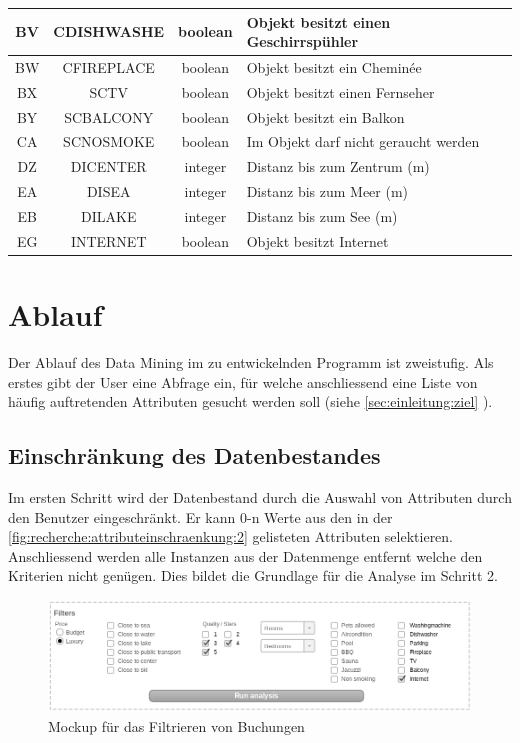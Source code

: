\begin{table}[H]
\begin{tabular}{ | c | c | c | l | }
		BV & CDISHWASHE & boolean & Objekt besitzt einen Geschirrspühler \\ \hline
		BW & CFIREPLACE & boolean & Objekt besitzt ein Cheminée \\ \hline 
		BX & SCTV & boolean & Objekt besitzt einen Fernseher \\ \hline  
		BY & SCBALCONY & boolean & Objekt besitzt ein Balkon \\ \hline 
		CA & SCNOSMOKE & boolean & Im Objekt darf nicht geraucht werden \\ \hline 
		DZ & DICENTER & integer & Distanz bis zum Zentrum (m) \\ \hline 
		EA & DISEA & integer & Distanz bis zum Meer (m) \\ \hline 
		EB & DILAKE & integer & Distanz bis zum See (m) \\ \hline 
		EG & INTERNET & boolean & Objekt besitzt Internet \\ \hline 
	\end{tabular}
\end{table}


\section{Ablauf}
\label{sec:konzept:ablauf}
Der Ablauf des Data Mining im zu entwickelnden Programm ist zweistufig. Als erstes gibt der User eine Abfrage ein, für welche anschliessend eine Liste von häufig auftretenden Attributen gesucht werden soll (siehe \cref{sec:einleitung:ziel} ).


\subsection{Einschränkung des Datenbestandes}
\label{sec:konzept:ablauf:einschraenkung}
Im ersten Schritt wird der Datenbestand durch die Auswahl von Attributen durch den Benutzer eingeschränkt. Er kann 0-n Werte aus den in der \cref{fig:recherche:attributeinschraenkung:2} gelisteten Attributen selektieren. Anschliessend werden alle Instanzen aus der Datenmenge entfernt welche den Kriterien nicht genügen. Dies bildet die Grundlage für die Analyse im Schritt 2.

\begin{figure}[H]
	\RawFloats
	\centering
	\includegraphics[width=1\textwidth]{images/wireframe-filtering}
	\caption{Mockup für das Filtrieren von Buchungen}
	\label{fig:konzept:ablauf:einschraenkung:1}
\end{figure}

